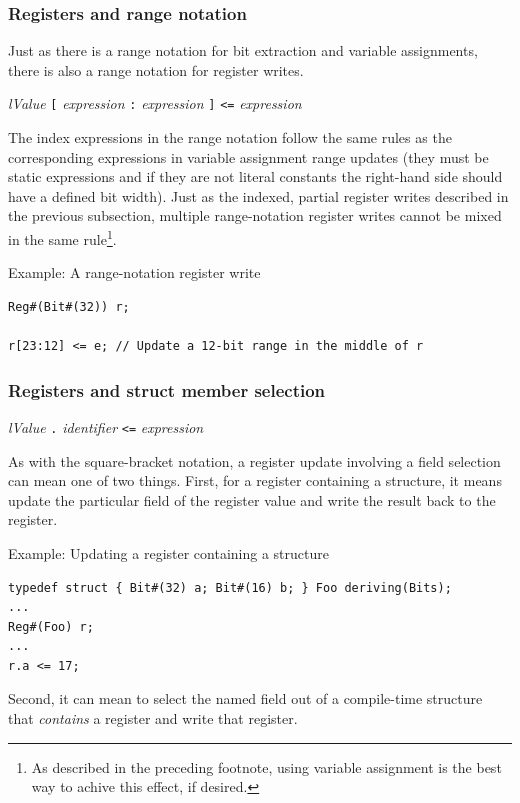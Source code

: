 \documentclass[twoside,letterpaper]{article}
\newcommand{\hm}{\hspace*{1em}}
\newcommand{\nterm}[1]{\emph{#1}}
\newcommand{\term}[1]{\texttt{#1}}
\newcommand{\gram}[2]{    \hm\makebox[10em][l]{\it #1}\makebox[1.5em][l]{::=}    #2}
\begin{document}
\subsubsection {Registers and range notation}
Just as there is a range notation for bit extraction and variable
assignments, there is also a range notation for register writes.

\gram{regWrite}{ \nterm{lValue} \term{[} \nterm{expression} \term{:} \nterm{expression} \term{]} \term{<=} \nterm{expression} }

The index expressions in the range notation follow the same rules as the 
corresponding expressions in variable assignment range updates (they must 
be static expressions and if they are not literal constants the right-hand 
side should have a defined bit width). Just as the indexed, partial register 
writes described in the previous subsection, multiple range-notation register 
writes cannot be mixed in the same rule\footnote{As described in the preceding 
footnote, using variable assignment is the best way to achive this effect, 
if desired.}. 

Example: A range-notation register write 
\begin{verbatim}
Reg#(Bit#(32)) r;

r[23:12] <= e; // Update a 12-bit range in the middle of r
\end{verbatim}

\subsubsection {Registers and struct member selection}

\gram{regWrite}{ \nterm{lValue} \term{.} \nterm{identifier} \term{<=} \nterm{expression}}

As with the square-bracket notation, a register update involving a field 
selection can mean one of two things. First, for a register containing a structure, 
it means update the particular field of the register value and write the result back 
to the register. 

Example: Updating a register containing a structure
\begin{verbatim}
typedef struct { Bit#(32) a; Bit#(16) b; } Foo deriving(Bits);
...
Reg#(Foo) r;
...
r.a <= 17;
\end{verbatim}

Second, it can mean to select the named field out of a compile-time 
structure that \emph{contains} a register and write that register. 
\end{document}
